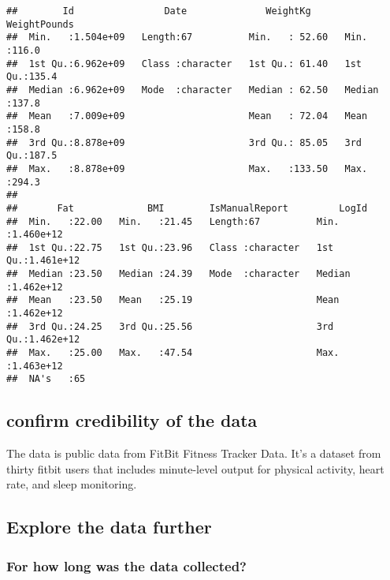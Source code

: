\documentclass[
]{article}
\newenvironment{Shaded}{\begin{snugshade}}{\end{snugshade}}
\newcommand{\CommentTok}[1]{\textcolor[rgb]{0.56,0.35,0.01}{\textit{#1}}}
\newcommand{\FunctionTok}[1]{\textcolor[rgb]{0.00,0.00,0.00}{#1}}
\newcommand{\NormalTok}[1]{#1}
\newcommand{\SpecialCharTok}[1]{\textcolor[rgb]{0.00,0.00,0.00}{#1}}
\begin{document}
\begin{verbatim}
##        Id                Date              WeightKg       WeightPounds  
##  Min.   :1.504e+09   Length:67          Min.   : 52.60   Min.   :116.0  
##  1st Qu.:6.962e+09   Class :character   1st Qu.: 61.40   1st Qu.:135.4  
##  Median :6.962e+09   Mode  :character   Median : 62.50   Median :137.8  
##  Mean   :7.009e+09                      Mean   : 72.04   Mean   :158.8  
##  3rd Qu.:8.878e+09                      3rd Qu.: 85.05   3rd Qu.:187.5  
##  Max.   :8.878e+09                      Max.   :133.50   Max.   :294.3  
##                                                                         
##       Fat             BMI        IsManualReport         LogId          
##  Min.   :22.00   Min.   :21.45   Length:67          Min.   :1.460e+12  
##  1st Qu.:22.75   1st Qu.:23.96   Class :character   1st Qu.:1.461e+12  
##  Median :23.50   Median :24.39   Mode  :character   Median :1.462e+12  
##  Mean   :23.50   Mean   :25.19                      Mean   :1.462e+12  
##  3rd Qu.:24.25   3rd Qu.:25.56                      3rd Qu.:1.462e+12  
##  Max.   :25.00   Max.   :47.54                      Max.   :1.463e+12  
##  NA's   :65
\end{verbatim}

\hypertarget{confirm-credibility-of-the-data}{%
\subsection{confirm credibility of the
data}\label{confirm-credibility-of-the-data}}

The data is public data from FitBit Fitness Tracker Data. It's a dataset
from thirty fitbit users that includes minute-level output for physical
activity, heart rate, and sleep monitoring.

\hypertarget{explore-the-data-further}{%
\subsection{Explore the data further}\label{explore-the-data-further}}

\hypertarget{for-how-long-was-the-data-collected}{%
\subsubsection{For how long was the data
collected?}\label{for-how-long-was-the-data-collected}}

\begin{Shaded}
\end{Shaded}
\end{document}

